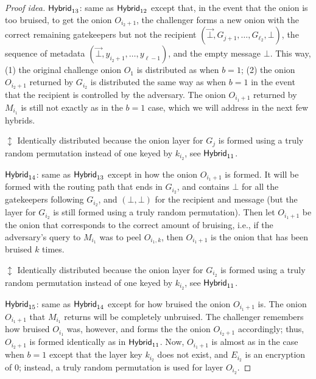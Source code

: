 \documentclass[runningheads,a4paper]{llncs}
\begin{document}
\begin{proof}[Proof idea]
\noindent $\mathsf{Hybrid}_{13}$: same as $\mathsf{Hybrid}_{12}$ except that, in the event that the onion is too bruised, %
to get the onion $O_{i_2+1}$, the challenger forms a new onion with the correct remaining gatekeepers but not the recipient $(\vec{\bot}, G_{j+1}, \dots, G_{\ell_2}, \bot)$, the sequence of metadata $(\vec{\bot}, y_{i_2+1}, \dots, y_{\ell-1})$, and the empty message $\bot$.
This way, (1) the original challenge onion $O_1$ is distributed as when $b=1$; (2) the onion $O_{i_2+1}$ returned by $G_{i_2}$ is distributed the same way as when $b=1$ in the event that the recipient is controlled by the adversary.  The onion $O_{i_1+1}$ returned by $M_{i_1}$ is still not exactly as in the $b=1$ case, which we will address in the next few hybrids.

    \textcolor{hybrid}{$\updownarrow$ Identically distributed because the onion layer for $G_{j}$ is formed using a truly random permutation instead of one keyed by $k_{i_2}$, see $\mathsf{Hybrid}_{11}$.
    }

\noindent $\mathsf{Hybrid}_{14}$: same as $\mathsf{Hybrid}_{13}$ except in how the onion $O_{i_1+1}$ is formed.  It will be formed with the routing path that ends in $G_{i_2}$, and contains $\bot$ for all the gatekeepers following $G_{i_2}$, and $(\bot,\bot)$ for the recipient and message (but the layer for $G_{i_2}$ is still formed using a truly random permutation). Then let $O_{i_1+1}$ be the onion that corresponds to the correct amount of bruising, i.e., if the adversary's query to $M_{i_1}$ was to peel $O_{i_1,k}$, then $O_{i_1+1}$ is the onion that has been bruised $k$ times. 

    \textcolor{hybrid}{$\updownarrow$ Identically distributed because the onion layer for $G_{i_2}$ is formed using a truly random permutation instead of one keyed by $k_{i_2}$, see $\mathsf{Hybrid}_{11}$.
    }

\noindent $\mathsf{Hybrid}_{15}$: same as $\mathsf{Hybrid}_{14}$ except for how bruised the onion $O_{i_1+1}$ is.  The onion $O_{i_1+1}$ that $M_{i_1}$ returns will be completely unbruised.  The challenger remembers how bruised $O_{i_1}$ was, however, and forms the the onion $O_{i_2+1}$ accordingly; thus, $O_{i_2+1}$ is formed identically as in $\mathsf{Hybrid}_{11}$.  Now, $O_{i_1+1}$ is almost as in the case when $b=1$  except that the layer key $k_{i_2}$ does not exist, and $E_{i_2}$ is an encryption of $0$; instead, a truly random permutation is used for layer $O_{i_2}$. 


\end{proof}
\end{document}
